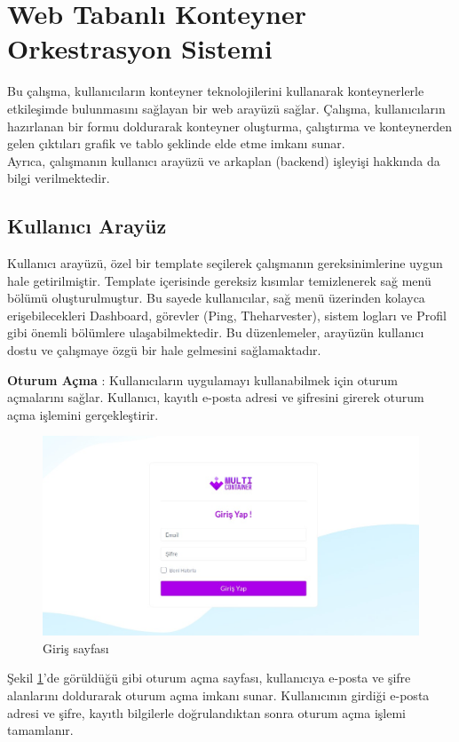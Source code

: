 \section{Web Tabanlı Konteyner Orkestrasyon Sistemi}\label{sec:study}
Bu çalışma, kullanıcıların konteyner teknolojilerini kullanarak konteynerlerle etkileşimde bulunmasını sağlayan bir web arayüzü sağlar. Çalışma, kullanıcıların hazırlanan bir formu doldurarak konteyner oluşturma, çalıştırma ve konteynerden gelen çıktıları grafik ve tablo şeklinde elde etme imkanı sunar.\\
Ayrıca, çalışmanın kullanıcı arayüzü ve arkaplan (backend) işleyişi hakkında da bilgi verilmektedir.
\subsection{Kullanıcı Arayüz}
Kullanıcı arayüzü, özel bir template seçilerek çalışmanın gereksinimlerine uygun hale getirilmiştir. Template içerisinde gereksiz kısımlar temizlenerek sağ menü bölümü oluşturulmuştur. Bu sayede kullanıcılar, sağ menü üzerinden kolayca erişebilecekleri Dashboard, görevler (Ping, Theharvester), sistem logları ve Profil gibi önemli bölümlere ulaşabilmektedir. Bu düzenlemeler, arayüzün kullanıcı dostu ve çalışmaye özgü bir hale gelmesini sağlamaktadır.

\textbf{Oturum Açma} : Kullanıcıların uygulamayı kullanabilmek için oturum açmalarını sağlar. Kullanıcı, kayıtlı e-posta adresi ve şifresini girerek oturum açma işlemini gerçekleştirir.
\begin{figure}[ht]
	\centering
	\includegraphics[width=0.7\linewidth]{images/login.jpeg}
	\caption{Giriş sayfası}
	\label{fig:login}
\end{figure}

Şekil \ref{fig:login}'de görüldüğü gibi oturum açma sayfası, kullanıcıya e-posta ve şifre alanlarını doldurarak oturum açma imkanı sunar. Kullanıcının girdiği e-posta adresi ve şifre, kayıtlı bilgilerle doğrulandıktan sonra oturum açma işlemi tamamlanır.

